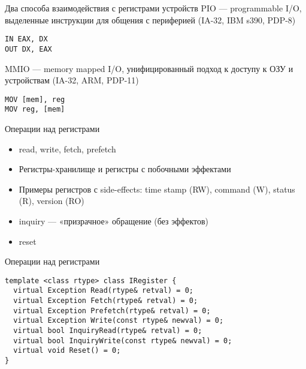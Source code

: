 \begin{frame}[fragile]{Два способа взаимодействия с регистрами устройств}
PIO — programmable I/O, выделенные инструкции для общения с периферией (IA-32, IBM s390, PDP-8)

\begin{verbatim}
IN EAX, DX
OUT DX, EAX
\end{verbatim}
\pause

MMIO — memory mapped I/O, унифицированный подход к доступу к ОЗУ и устройствам (IA-32, ARM, PDP-11)

\begin{verbatim}
MOV [mem], reg
MOV reg, [mem]
\end{verbatim}

\end{frame}

\begin{frame}{Операции над регистрами}
\begin{itemize}
\item read, write, fetch, prefetch
\item Регистры-хранилище и регистры с побочными эффектами
\item Примеры регистров с side-effects: time stamp (RW), command (W), status (R), version (RO)
\item inquiry — «призрачное» обращение (без эффектов)
\item reset
\end{itemize}

\end{frame}

\begin{frame}[fragile]{Операции над регистрами}
\begin{verbatim}
template <class rtype> class IRegister {
  virtual Exception Read(rtype& retval) = 0;
  virtual Exception Fetch(rtype& retval) = 0;
  virtual Exception Prefetch(rtype& retval) = 0;
  virtual Exception Write(const rtype& newval) = 0;
  virtual bool InquiryRead(rtype& retval) = 0;
  virtual bool InquiryWrite(const rtype& newval) = 0;
  virtual void Reset() = 0;
}
\end{verbatim}
\end{frame}


